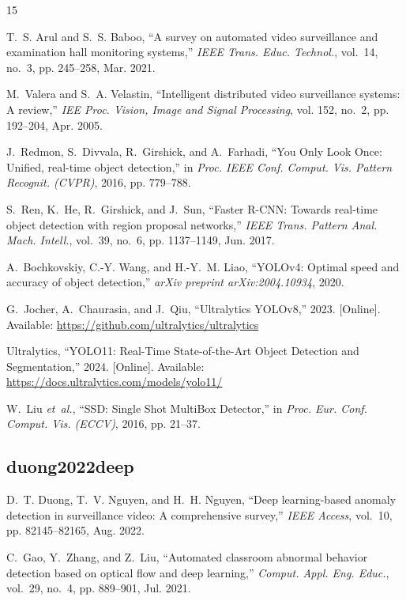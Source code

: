 \documentclass[conference]{IEEEtran}
\begin{document}

\begin{thebibliography}{15}

T.~S. Arul and S.~S. Baboo, ``A survey on automated video surveillance and examination hall monitoring systems,'' \emph{IEEE Trans. Educ. Technol.}, vol.~14, no.~3, pp. 245--258, Mar. 2021.

M.~Valera and S.~A. Velastin, ``Intelligent distributed video surveillance systems: A review,'' \emph{IEE Proc. Vision, Image and Signal Processing}, vol. 152, no.~2, pp. 192--204, Apr. 2005.

J.~Redmon, S.~Divvala, R.~Girshick, and A.~Farhadi, ``You Only Look Once: Unified, real-time object detection,'' in \emph{Proc. IEEE Conf. Comput. Vis. Pattern Recognit. (CVPR)}, 2016, pp. 779--788.

S.~Ren, K.~He, R.~Girshick, and J.~Sun, ``Faster R-CNN: Towards real-time object detection with region proposal networks,'' \emph{IEEE Trans. Pattern Anal. Mach. Intell.}, vol.~39, no.~6, pp. 1137--1149, Jun. 2017.

A.~Bochkovskiy, C.-Y. Wang, and H.-Y.~M. Liao, ``YOLOv4: Optimal speed and accuracy of object detection,'' \emph{arXiv preprint arXiv:2004.10934}, 2020.

G.~Jocher, A.~Chaurasia, and J.~Qiu, ``Ultralytics YOLOv8,'' 2023. [Online]. Available: \url{https://github.com/ultralytics/ultralytics}

Ultralytics, ``YOLO11: Real-Time State-of-the-Art Object Detection and Segmentation,'' 2024. [Online]. Available: \url{https://docs.ultralytics.com/models/yolo11/}

W.~Liu \emph{et~al.}, ``SSD: Single Shot MultiBox Detector,'' in \emph{Proc. Eur. Conf. Comput. Vis. (ECCV)}, 2016, pp. 21--37.

\subsection{duong2022deep}
D.~T. Duong, T.~V. Nguyen, and H.~H. Nguyen, ``Deep learning-based anomaly detection in surveillance video: A comprehensive survey,'' \emph{IEEE Access}, vol.~10, pp. 82145--82165, Aug. 2022.

C.~Gao, Y.~Zhang, and Z.~Liu, ``Automated classroom abnormal behavior detection based on optical flow and deep learning,'' \emph{Comput. Appl. Eng. Educ.}, vol.~29, no.~4, pp. 889--901, Jul. 2021.


\end{thebibliography}
\end{document}
